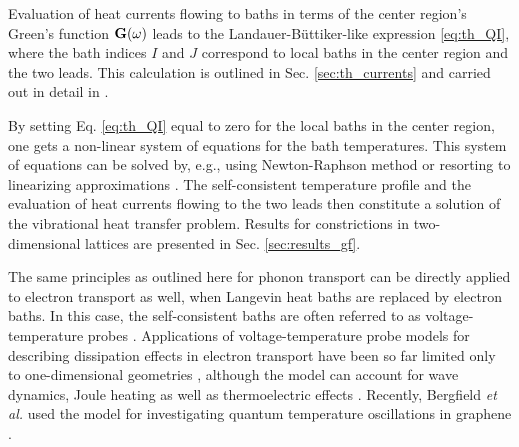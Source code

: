 Evaluation of heat currents flowing to baths in terms of the center region's Green's function $\mathbf{G}(\omega)$ leads to the Landauer-B\"uttiker-like expression \eqref{eq:th_QI}, where the bath indices $I$ and $J$ correspond to local baths in the center region and the two leads. This calculation is outlined in Sec. \ref{sec:th_currents} and carried out in detail in . %

By setting Eq. \eqref{eq:th_QI} equal to zero for the local baths in the center region, one gets a non-linear system of equations for the bath temperatures. This system of equations can be solved by, e.g., using Newton-Raphson method \cite{bandyopadhyay11} or resorting to linearizing approximations \cite{segal09}. The self-consistent temperature profile and the evaluation of heat currents flowing to the two leads then constitute a solution of the vibrational heat transfer problem. Results for constrictions in two-dimensional lattices are presented in Sec. \ref{sec:results_gf}.

The same principles as outlined here for phonon transport can be directly applied to electron transport as well, when Langevin heat baths are replaced by electron baths. In this case, the self-consistent baths are often referred to as voltage-temperature probes \cite{jacquet09}. Applications of voltage-temperature probe models for describing dissipation effects in electron transport have been so far limited only to one-dimensional geometries \cite{buttiker86,damato90,jacquet09,jacquet12}, although the model can account for wave dynamics, Joule heating as well as thermoelectric effects \cite{roy07}. Recently, Bergfield \textit{et al.} used the model for investigating quantum temperature oscillations in graphene \cite{bergfield15}.



